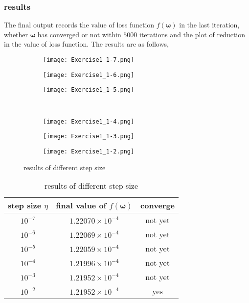 \documentclass[a4paper,11pt]{article}
\begin{document}
\subsubsection*{results}
The final output records the value of loss function $f(\bm{\omega})$ in the last iteration, whether $\bm{\omega}$ has converged or not within $5000$ iterations and the plot of reduction in the value of loss function. The results are as follows,\\  
\begin{figure}[H]
	\centering
	\begin{subfigure}[t]{0.2\textwidth}
		\centering
		\texttt{[image: Exercise1\_1-7.png]}
	\end{subfigure}
	\quad
	\begin{subfigure}[t]{0.2\textwidth}
		\centering
		\texttt{[image: Exercise1\_1-6.png]}
	\end{subfigure}
	\quad
	\begin{subfigure}[t]{0.2\textwidth}
		\centering
		\texttt{[image: Exercise1\_1-5.png]}
	\end{subfigure}
	\\
	\begin{subfigure}[t]{0.2\textwidth}
	\centering
	\texttt{[image: Exercise1\_1-4.png]}
	\end{subfigure}
	\quad
	\begin{subfigure}[t]{0.2\textwidth}
		\centering
		\texttt{[image: Exercise1\_1-3.png]}
	\end{subfigure}
		\quad
	\begin{subfigure}[t]{0.2\textwidth}
		\centering
		\texttt{[image: Exercise1\_1-2.png]}
	\end{subfigure}
	\caption{results of different step size}
\end{figure}
\par
\begin{table}[H]
	\begin{center}
		\caption{results of different step size}
		\begin{tabular}{ccc}
			\toprule[2pt] 
			step size $\eta$ & final value of $f(\bm{\omega})$	 &converge  \\ 
			\hline 
			$10^{-7}$ & $1.22070\times 10^{-4} $ & not yet \\ 
			$10^{-6}$ & $1.22069\times 10^{-4}$ &  not yet\\ 
			$10^{-5}$ & $1.22059\times 10^{-4}$ &  not yet\\
			$10^{-4}$ & $1.21996\times 10^{-4}$ &  not yet\\
			$10^{-3}$ & $1.21952\times 10^{-4}$ &  not yet\\
			$10^{-2}$ & $1.21952\times 10^{-4} $ & yes\\
			\bottomrule[2pt]
		\end{tabular} 
	\end{center}
\end{table}
\end{document}
